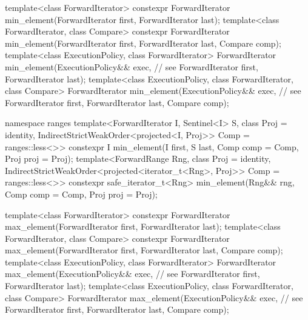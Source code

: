 \begin{codeblock}
  template<class ForwardIterator>
    constexpr ForwardIterator min_element(ForwardIterator first, ForwardIterator last);
  template<class ForwardIterator, class Compare>
    constexpr ForwardIterator min_element(ForwardIterator first, ForwardIterator last,
                                          Compare comp);
  template<class ExecutionPolicy, class ForwardIterator>
    ForwardIterator min_element(ExecutionPolicy&& exec, // see 
                                ForwardIterator first, ForwardIterator last);
  template<class ExecutionPolicy, class ForwardIterator, class Compare>
    ForwardIterator min_element(ExecutionPolicy&& exec, // see 
                                ForwardIterator first, ForwardIterator last,
                                Compare comp);
\end{codeblock}\begin{addedblock}\begin{codeblock}
  namespace ranges {
    template<ForwardIterator I, Sentinel<I> S, class Proj = identity,
        IndirectStrictWeakOrder<projected<I, Proj>> Comp = ranges::less<>>
      constexpr I min_element(I first, S last, Comp comp = Comp{}, Proj proj = Proj{});
    template<ForwardRange Rng, class Proj = identity,
        IndirectStrictWeakOrder<projected<iterator_t<Rng>, Proj>> Comp = ranges::less<>>
      constexpr safe_iterator_t<Rng>
        min_element(Rng&& rng, Comp comp = Comp{}, Proj proj = Proj{});
  }
\end{codeblock}\end{addedblock}\begin{codeblock}
  template<class ForwardIterator>
    constexpr ForwardIterator max_element(ForwardIterator first, ForwardIterator last);
  template<class ForwardIterator, class Compare>
    constexpr ForwardIterator max_element(ForwardIterator first, ForwardIterator last,
                                          Compare comp);
  template<class ExecutionPolicy, class ForwardIterator>
    ForwardIterator max_element(ExecutionPolicy&& exec, // see 
                                ForwardIterator first, ForwardIterator last);
  template<class ExecutionPolicy, class ForwardIterator, class Compare>
    ForwardIterator max_element(ExecutionPolicy&& exec, // see 
                                ForwardIterator first, ForwardIterator last,
                                Compare comp);
\end{codeblock}\begin{addedblock}\begin{codeblock}

\end{codeblock}
\end{addedblock}
